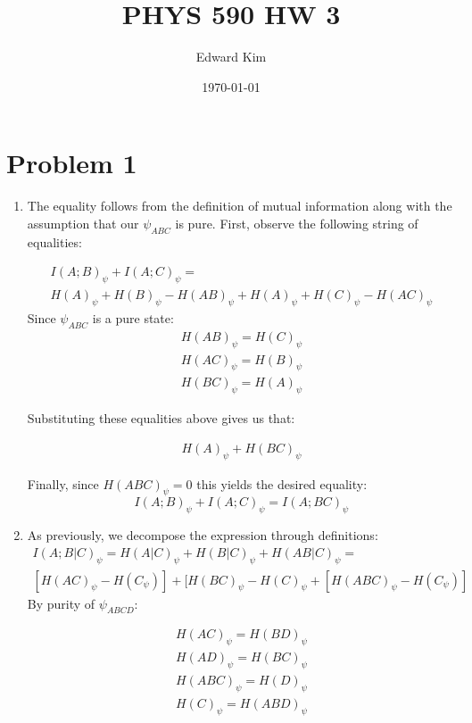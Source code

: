 \documentclass[12pt]{article}%
\begin{document}
\title{PHYS 590 HW 3}
\author{Edward Kim}
\date{\today}
\maketitle

\section*{Problem 1}
\begin{enumerate}
  \item
  The equality follows from the definition of mutual information along with the assumption that our $\psi_{ABC}$ is pure. First, observe the following string of equalities:

  \begin{gather*}
    I(A;B)_{\psi} + I(A;C)_{\psi} = \\
    H(A)_{\psi} + H(B)_{\psi} - H(AB)_{\psi} + H(A)_{\psi} + H(C)_{\psi} - H(AC)_{\psi}
  \end{gather*}
  Since $\psi_{ABC}$ is a pure state:
  \begin{gather*}
    H(AB)_{\psi} = H(C)_{\psi} \\
    H(AC)_{\psi} = H(B)_{\psi} \\
    H(BC)_{\psi} = H(A)_{\psi}
  \end{gather*}

  Substituting these equalities above gives us that:

  \begin{gather*}
    H(A)_{\psi} + H(BC)_{\psi}
  \end{gather*}

  Finally, since $H(ABC)_{\psi} = 0$ this yields the desired equality:
  $$  I(A;B)_{\psi} + I(A;C)_{\psi} = \boxed{I(A;BC)_{\psi}} $$

\item
As previously, we decompose the expression through definitions:
\begin{gather*}
    I(A;B\vert C)_{\psi} = H(A\vert C)_{\psi} + H(B \vert C)_{\psi} + H(AB \vert C)_{\psi} = \\
    [ H(AC)_{\psi} - H(C_{\psi})] + [H(BC)_{\psi} - H(C)_{\psi} + [H(ABC)_{\psi} - H(C_{\psi})]
\end{gather*}
By purity of $\psi_{ABCD}$:

\begin{gather*}
  H(AC)_{\psi} = H(BD)_{\psi} \\
  H(AD)_{\psi} = H(BC)_{\psi} \\
  H(ABC)_{\psi} = H(D)_{\psi} \\
  H(C)_{\psi} = H(ABD)_{\psi}
\end{gather*}


\end{enumerate}
\end{document}
